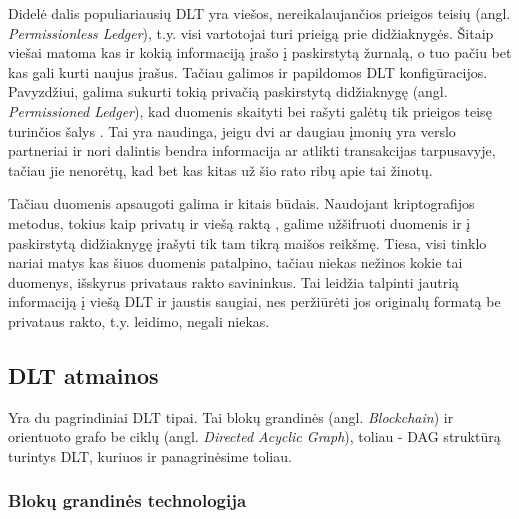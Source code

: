 Didelė dalis populiariausių DLT yra viešos, nereikalaujančios prieigos teisių (angl. \textit{Permissionless Ledger}), t.y. visi vartotojai turi prieigą prie didžiaknygės. Šitaip viešai matoma kas ir kokią informaciją įrašo į paskirstytą žurnalą, o tuo pačiu bet kas gali kurti naujus įrašus. Tačiau galimos ir papildomos DLT konfigūracijos. Pavyzdžiui, galima sukurti tokią privačią paskirstytą didžiaknygę (angl. \textit{Permissioned Ledger}), kad duomenis skaityti bei rašyti galėtų tik prieigos teisę turinčios šalys \cite{backlund2016technical}. Tai yra naudinga, jeigu dvi ar daugiau įmonių yra verslo partneriai ir nori dalintis bendra informacija ar atlikti transakcijas tarpusavyje, tačiau jie nenorėtų, kad bet kas kitas už šio rato ribų apie tai žinotų. 

Tačiau duomenis apsaugoti galima ir kitais būdais. Naudojant kriptografijos metodus, tokius kaip privatų ir viešą raktą \cite{zyskind2015decentralizing}, galime užšifruoti duomenis ir į paskirstytą didžiaknygę įrašyti tik tam tikrą maišos reikšmę. Tiesa, visi tinklo nariai matys kas šiuos duomenis patalpino, tačiau niekas nežinos kokie tai duomenys, išskyrus privataus rakto savininkus. Tai leidžia talpinti jautrią informaciją į viešą DLT ir jaustis saugiai, nes peržiūrėti jos originalų formatą be privataus rakto, t.y. leidimo, negali niekas.




\subsection{DLT atmainos}

Yra du pagrindiniai DLT tipai. Tai blokų grandinės (angl. \textit{Blockchain}) ir orientuoto grafo be ciklų (angl. \textit{Directed Acyclic Graph}), toliau - DAG struktūrą turintys DLT, kuriuos ir panagrinėsime toliau.




\subsubsection{Blokų grandinės technologija}

